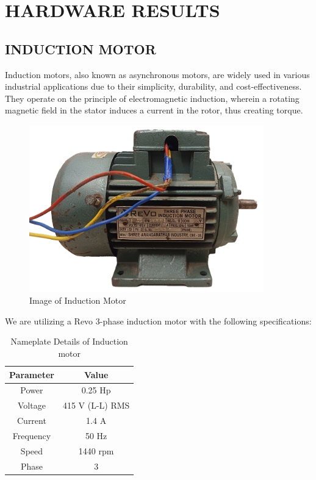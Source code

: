 \section{HARDWARE RESULTS}


\subsection{INDUCTION MOTOR}

Induction motors, also known as asynchronous motors, are widely used in various industrial applications due to their simplicity, durability, and cost-effectiveness. They operate on the principle of electromagnetic induction, wherein a rotating magnetic field in the stator induces a current in the rotor, thus creating torque.

\begin{figure}[H]
	\centering
	\includegraphics[width=4.0in]{sections/section4/images/inductionMotor/revo.png}
	\caption{Image of Induction Motor}
\end{figure}

We are utilizing a Revo 3-phase induction motor with the following specifications:

\begin{table}[H]
	\centering
	\begin{tabular}{|c|c|}
		\hline
		\textbf{Parameter} & \textbf{Value} \\ \hline
		Power & 0.25 Hp \\ \hline
		Voltage & 415 V (L-L) RMS \\ \hline
		Current & 1.4 A \\ \hline
		Frequency & 50 Hz \\ \hline
		Speed & 1440 rpm \\ \hline
		Phase & 3 \\ \hline
	\end{tabular}
	\caption{Nameplate Details of Induction motor}
\end{table}




